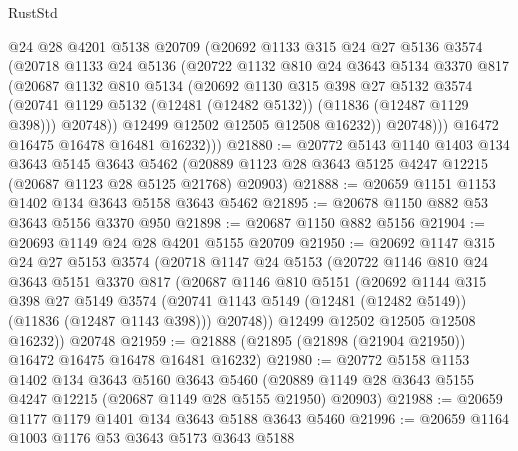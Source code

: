 \begin{lexlean}{RustStd}
\begin{coremodule}
              @24
              @28
              @4201
              @5138
              @20709
              (@20692
                @1133
                @315
                @24
                @27
                @5136
                @3574
                (@20718
                  @1133
                  @24
                  @5136
                  (@20722
                    @1132
                    @810
                    @24
                    @3643
                    @5134
                    @3370
                    @817
                    (@20687
                      @1132
                      @810
                      @5134
                      (@20692
                        @1130
                        @315
                        @398
                        @27
                        @5132
                        @3574
                        (@20741 @1129 @5132 (@12481 (@12482 @5132)) (@11836 (@12487 @1129 @398)))
                        @20748))
                    @12499
                    @12502
                    @12505
                    @12508
                    @16232))
                @20748)))
          @16472
          @16475
          @16478
          @16481
          @16232)))
@21880 := @20772
    @5143
    @1140
    @1403
    @134
    @3643
    @5145
    @3643
    @5462
    (@20889 @1123 @28 @3643 @5125 @4247 @12215 (@20687 @1123 @28 @5125 @21768) @20903)
@21888 := @20659 @1151 @1153 @1402 @134 @3643 @5158 @3643 @5462
@21895 := @20678 @1150 @882 @53 @3643 @5156 @3370 @950
@21898 := @20687 @1150 @882 @5156
@21904 := @20693 @1149 @24 @28 @4201 @5155 @20709
@21950 := @20692
    @1147
    @315
    @24
    @27
    @5153
    @3574
    (@20718
      @1147
      @24
      @5153
      (@20722
        @1146
        @810
        @24
        @3643
        @5151
        @3370
        @817
        (@20687
          @1146
          @810
          @5151
          (@20692
            @1144
            @315
            @398
            @27
            @5149
            @3574
            (@20741 @1143 @5149 (@12481 (@12482 @5149)) (@11836 (@12487 @1143 @398)))
            @20748))
        @12499
        @12502
        @12505
        @12508
        @16232))
    @20748
@21959 := @21888 (@21895 (@21898 (@21904 @21950)) @16472 @16475 @16478 @16481 @16232)
@21980 := @20772
    @5158
    @1153
    @1402
    @134
    @3643
    @5160
    @3643
    @5460
    (@20889 @1149 @28 @3643 @5155 @4247 @12215 (@20687 @1149 @28 @5155 @21950) @20903)
@21988 := @20659 @1177 @1179 @1401 @134 @3643 @5188 @3643 @5460
@21996 := @20659 @1164 @1003 @1176 @53 @3643 @5173 @3643 @5188

\end{coremodule}
\end{lexlean}
